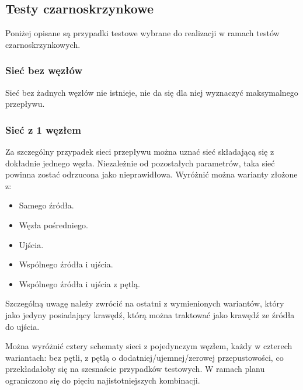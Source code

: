 \subsection{Testy czarno\dywiz skrzynkowe}
Poniżej opisane są przypadki testowe wybrane do realizacji w ramach testów
czarno\dywiz skrzynkowych.

\subsubsection{Sieć bez węzłów}
Sieć bez żadnych węzłów nie istnieje, nie da się dla niej wyznaczyć maksymalnego
przepływu.

\subsubsection{Sieć z 1 węzłem}
Za szczególny przypadek sieci przepływu można uznać sieć składającą się z
dokładnie jednego węzła. Niezależnie od pozostałych parametrów, taka sieć
powinna zostać odrzucona jako nieprawidłowa. Wyróżnić można warianty złożone z:
\begin{itemize}[nosep]
    \item Samego źródła.
    \item Węzła pośredniego.
    \item Ujścia.
    \item Wspólnego źródła i ujścia.
    \item Wspólnego źródła i ujścia z pętlą.
\end{itemize}
Szczególną uwagę należy zwrócić na ostatni z wymienionych wariantów, który jako
jedyny posiadający krawędź, którą można traktować jako krawędź ze źródła do
ujścia.

Można wyróżnić cztery schematy sieci z pojedynczym węzłem, każdy w czterech
wariantach: bez pętli, z pętlą o dodatniej/ujemnej/zerowej przepustowości, co
przekładałoby się na szesnaście przypadków testowych. W ramach planu ograniczono
się do pięciu najistotniejszych kombinacji.

